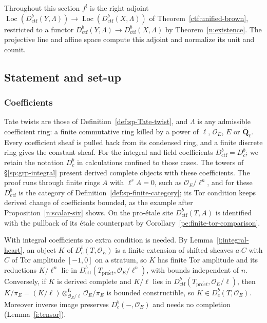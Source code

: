 \documentclass[11pt,a4paper]{article}
\numberwithin{equation}{section}
\theoremstyle{definition}
\theoremstyle{remark}
\newcommand{\Dbc}{D^b_c}
\newcommand{\Loc}{\operatorname{Loc}}
\newcommand{\Qbar}{\overline{\mathbf Q}_\ell}
\newcommand{\proet}{\mathrm{pro}\acute{e}t}
\newcommand{\Dctf}{D^b_{\mathrm{ctf}}}
\begin{document}
Throughout this section $f^!$ is the right adjoint
$\Loc(\Dctf(Y,\Lambda))\to\Loc(\Dctf(X,\Lambda))$ of
Theorem~\ref{ctf:unified-brown}, restricted to a functor
$\Dctf(Y,\Lambda)\to\Dctf(X,\Lambda)$ by Theorem~\ref{n:existence}. The projective line and affine space compute
this adjoint and normalize its unit and counit.

\subsection{Statement and set-up}
\label{sp:grp-setup}

\subsubsection{Coefficients}

Tate twists are those of Definition~\ref{def:sp-Tate-twist}, and
$\Lambda$ is any admissible coefficient ring:
a finite commutative ring killed by a power of $\ell$, $\mathcal O_E$,
$E$ or $\Qbar$. Every coefficient sheaf is pulled back from its
condensed ring, and a finite discrete ring gives the constant sheaf.
For the integral and field coefficients $\Dctf=\Dbc$; we retain the
notation $\Dbc$ in calculations confined to those cases. The towers of
\S\ref{sp:grp-integral} present derived complete objects with these
coefficients. The proof runs through finite rings $A$ with $\ell^rA=0$,
such as $\mathcal O_E/\ell^n$, and for these $\Dctf$ is the category of
Definition~\ref{def:sp-finite-category}; its Tor condition keeps derived
change of coefficients bounded, as the example after
Proposition~\ref{n:scalar-six} shows. On the pro-\'etale site $\Dctf(T,A)$ is identified with the pullback
of its \'etale counterpart by Corollary~\ref{pe:finite-tor-comparison}.

With integral coefficients no extra condition is needed. By
Lemma~\ref{i:integral-heart}, an object $K$ of $\Dbc(T,\mathcal O_E)$ is a
finite extension of shifted sheaves $a_!C$ with $C$ of Tor amplitude
$[-1,0]$ on a stratum, so $K$ has finite Tor amplitude and its reductions
$K/\ell^n$ lie in $\Dctf(T_{\proet},\mathcal O_E/\ell^n)$, with bounds
independent of $n$. Conversely, if $K$ is derived complete and $K/\ell$
lies in $\Dctf(T_{\proet},\mathcal O_E/\ell)$, then
$K/\pi_E=(K/\ell)\otimes^{\mathbf L}_{\mathcal O_E/\ell}\mathcal O_E/\pi_E$
is bounded constructible, so $K\in\Dbc(T,\mathcal O_E)$. Moreover inverse
image preserves $\Dbc(-,\mathcal O_E)$ and needs no completion
(Lemma~\ref{i:tensor}).
\end{document}
